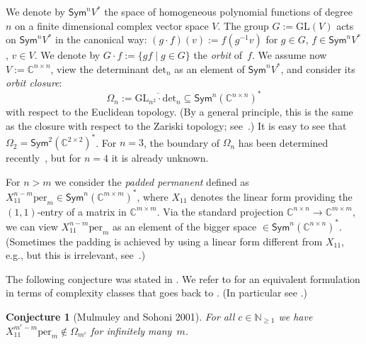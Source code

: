 \documentclass[11pt]{amsart}
\def\N{\mathbb{N}}
\def\C{\mathbb{C}}
\def\det{\mathrm{det}}
\def\per{\mathrm{per}}
\def\GL{\mathrm{GL}}
\def\Sym{\mathsf{Sym}}
\newcommand{\Det}{\Omega}
\newcommand{\ol}[1]{\overline{#1}}
\numberwithin{equation}{section}
\newtheorem{conjecture}[theorem]{Conjecture}
\begin{document}
We denote by $\Sym^n V^*$ the space of homogeneous polynomial functions of degree~$n$ on 
a finite dimensional complex vector space $V$.
The group $G:=\GL(V)$ acts on $\Sym^n V^*$ in the canonical way: %
$(g \cdot f)(v) := f(g^{-1}v)$ for $g\in G$, $f\in \Sym^n V^*$, $v\in V$.  
We denote by $G\cdot f :=\{ gf \mid g\in G\}$ the {\em orbit} of~$f$.
We assume now $V:=\C^{n\times n}$, view the determinant $\det_n$ as an element of $\Sym^n V^*$,
and consider its {\em orbit closure}: 
\begin{equation}\label{def:Omegan}
\Det_n := \ol{\GL_{n^2}\cdot \det_n} \subseteq \Sym^n (\C^{n\times n})^* 
\end{equation}
with respect to the Euclidean topology. (By a general principle, 
this is the same as the closure with respect to the Zariski topology; 
see~\cite[\S2.C]{mumf:95}.) 
It is easy to see that $\Det_2 = \Sym^2(\C^{2\times 2})^*$. 
For $n=3$, the boundary of $\Det_n$ has been determined recently~\cite{lahu:16}, 
but for $n=4$ it is already unknown. 

For $n > m$ we consider the {\em padded permanent} defined as 
$X_{11}^{n-m} \per_m \in\Sym^n (\C^{m\times m})^*$, where $X_{11}$ denotes the linear form 
providing the $(1,1)$-entry of a matrix in $\C^{m\times m}$. 
Via the standard projection $\C^{n\times n} \to \C^{m\times m}$, we can view 
$X_{11}^{n-m} \per_m$ as an element of the bigger space $\in\Sym^n (\C^{n\times n})^*$.
(Sometimes the padding is achieved by using a linear form different from $X_{11}$, e.g., 
but this is irrelevant, see~\cite[Appendix]{ik-panova:15}.) 

The following conjecture was stated in \cite{gct1}.
We refer to \cite[Prop.~9.3.2]{BLMW:11} for an equivalent formulation 
in terms of complexity classes that goes back to \cite{buerg:04}. 
(In particular see \cite[Problem~4.3]{buerg:04}.)  

\begin{conjecture}[Mulmuley and Sohoni 2001]\label{conj:dc-bord}
For all $c\in\N_{\ge 1}$ 
we have $X_{11}^{m^c-m} \per_m \not\in \Det_{m^c}$ 
for infinitely many~$m$.
\end{conjecture}
\end{document}
